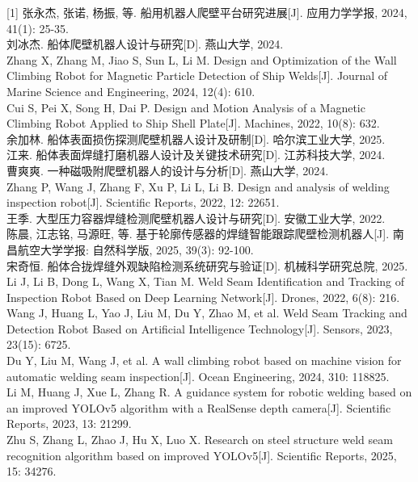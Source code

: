 \documentclass[UTF8,a4paper,12pt]{ctexrep}
\begin{document}
[1] 张永杰, 张诺, 杨振, 等. 船用机器人爬壁平台研究进展[J]. 应用力学学报, 2024, 41(1): 25-35.\\
[2] 刘冰杰. 船体爬壁机器人设计与研究[D]. 燕山大学, 2024.\\
[3] Zhang X, Zhang M, Jiao S, Sun L, Li M. Design and Optimization of the Wall Climbing Robot for Magnetic Particle Detection of Ship Welds[J]. Journal of Marine Science and Engineering, 2024, 12(4): 610.\\
[4] Cui S, Pei X, Song H, Dai P. Design and Motion Analysis of a Magnetic Climbing Robot Applied to Ship Shell Plate[J]. Machines, 2022, 10(8): 632.\\
[5] 余加林. 船体表面损伤探测爬壁机器人设计及研制[D]. 哈尔滨工业大学, 2025.\\
[6] 江来. 船体表面焊缝打磨机器人设计及关键技术研究[D]. 江苏科技大学, 2024.\\
[7] 曹爽爽. 一种磁吸附爬壁机器人的设计与分析[D]. 燕山大学, 2024.\\
[8] Zhang P, Wang J, Zhang F, Xu P, Li L, Li B. Design and analysis of welding inspection robot[J]. Scientific Reports, 2022, 12: 22651.\\
[9] 王季. 大型压力容器焊缝检测爬壁机器人设计与研究[D]. 安徽工业大学, 2022.\\
[10] 陈晨, 江志铭, 马源旺, 等. 基于轮廓传感器的焊缝智能跟踪爬壁检测机器人[J]. 南昌航空大学学报: 自然科学版, 2025, 39(3): 92-100.\\
[11] 宋奇恒. 船体合拢焊缝外观缺陷检测系统研究与验证[D]. 机械科学研究总院, 2025.\\
[12] Li J, Li B, Dong L, Wang X, Tian M. Weld Seam Identification and Tracking of Inspection Robot Based on Deep Learning Network[J]. Drones, 2022, 6(8): 216.\\
[13] Wang J, Huang L, Yao J, Liu M, Du Y, Zhao M, et al. Weld Seam Tracking and Detection Robot Based on Artificial Intelligence Technology[J]. Sensors, 2023, 23(15): 6725.\\
[14] Du Y, Liu M, Wang J, et al. A wall climbing robot based on machine vision for automatic welding seam inspection[J]. Ocean Engineering, 2024, 310: 118825.\\
[15] Li M, Huang J, Xue L, Zhang R. A guidance system for robotic welding based on an improved YOLOv5 algorithm with a RealSense depth camera[J]. Scientific Reports, 2023, 13: 21299.\\
[16] Zhu S, Zhang L, Zhao J, Hu X, Luo X. Research on steel structure weld seam recognition algorithm based on improved YOLOv5[J]. Scientific Reports, 2025, 15: 34276.\\
\end{document}
